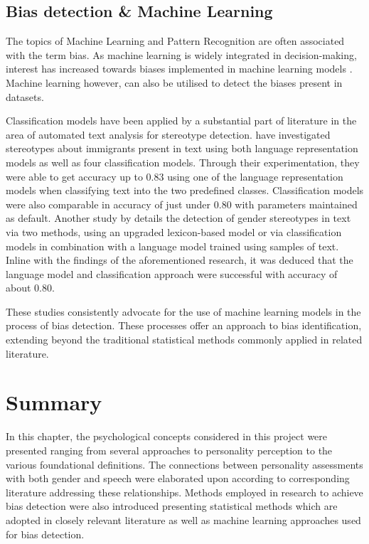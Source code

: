 \documentclass{l4proj}
\begin{document}
\subsection{Bias detection \& Machine Learning}
\label{sec:Bias_ML}
The topics of Machine Learning and Pattern Recognition are often associated with the term bias. As machine learning is widely integrated in decision-making, interest has increased towards biases implemented in machine learning models \citep{Mehrabi2021}. Machine learning however, can also be utilised to detect the biases present in datasets.

Classification models have been applied by a substantial part of literature in the area of automated text analysis for stereotype detection. 
\citet{Sánchez2021}  have investigated stereotypes about immigrants present in text using both language representation models as well as four classification models. Through their experimentation, they were able to get accuracy up to 0.83 using one of the language representation models when classifying text into the two predefined classes. Classification models were also comparable in accuracy of just under 0.80 with parameters maintained as default.
Another study by \citet{Honolulu2020} details the detection of gender stereotypes in text via two methods, using an upgraded lexicon-based model or via classification models in combination with a language model trained using samples of text. Inline with the findings of the aforementioned research, it was deduced that the language model and classification approach were successful with accuracy of about 0.80. 

These studies consistently advocate for the use of machine learning models in the process of bias detection. These processes offer an approach to bias identification, extending beyond the traditional statistical methods commonly applied in related literature.


\section{Summary}
In this chapter, the psychological concepts considered in this project were presented ranging from several approaches to personality perception to the various foundational definitions. The connections between personality assessments with both gender and speech were elaborated upon according to corresponding literature addressing these relationships. Methods employed in research to achieve bias detection were also introduced presenting statistical methods which are adopted in closely relevant literature as well as machine learning approaches used for bias detection. 
\end{document}
